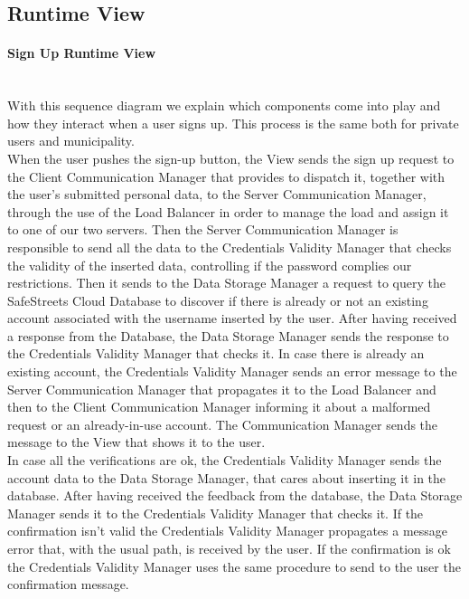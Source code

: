 \documentclass[titlepage]{article}
\begin{document}
\subsection{Runtime View\\}
\paragraph{Sign Up Runtime View\\ \\}
With this sequence diagram we explain which components come into play and how they interact when a user signs up.
This process is the same both for private users and municipality.\\
When the user pushes the sign-up button, the View sends the sign up request to the Client Communication Manager that provides to dispatch it, together with the user's submitted personal data, to the Server Communication Manager, through the use of the Load Balancer in order to manage the load and assign it to one of our two servers. Then the Server Communication Manager is responsible to send all the data to the Credentials Validity Manager that checks the validity of the inserted data, controlling if the password complies our restrictions. Then it sends to the Data Storage Manager a request to query the SafeStreets Cloud Database to discover if there is already or not an existing account associated with the username inserted by the user. After having received a response from the Database, the Data Storage Manager sends the response to the Credentials Validity Manager that checks it. In case there is already an existing account, the Credentials Validity Manager sends an error message to the Server Communication Manager that propagates it to the Load Balancer and then to the Client Communication Manager informing it about a malformed request or an already-in-use account. The Communication Manager sends the message to the View that shows it to the user. \\
In case all the verifications are ok, the Credentials Validity Manager sends the account data to the Data Storage Manager, that cares about inserting it in the database. After having received the feedback from the database, the Data Storage Manager sends it to the Credentials Validity Manager that checks it. If the confirmation isn't valid the Credentials Validity Manager propagates a message error that, with the usual path, is received by the user. If the confirmation is ok the Credentials Validity Manager uses the same procedure to send to the user the confirmation message.
\end{document}
